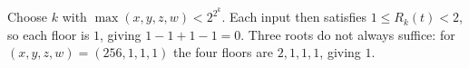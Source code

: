 Choose $k$ with $\max(x,y,z,w)<2^{2^k}$. Each input then satisfies $1\le R_k(t)<2$, so each floor is $1$, giving $1-1+1-1=0$. Three roots do not always suffice: for $(x,y,z,w)=(256,1,1,1)$ the four floors are $2,1,1,1$, giving $1$.
